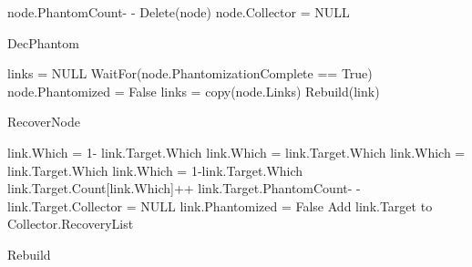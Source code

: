 \setlength{\textfloatsep}{0pt}
\begin{algorithm}[H]
	\scriptsize
	
	\begin{multicols}{2}
		\begin{algorithmic}[1]
{}
\State node.PhantomCount- -
\State Delete(node)
\Else
\State node.Collector = NULL
\EndIf
\EndIf
{}
\EndProcedure
\caption{DecPhantom}
\label{single:algorithm:decPhantom}
\end{algorithmic}
\end{multicols}
\end{algorithm}
\setlength{\textfloatsep}{0pt}



\begin{algorithm}[H]
	\scriptsize
	
	\begin{multicols}{2}
		\begin{algorithmic}[1]
{}
\State links = NULL
\State WaitFor(node.PhantomizationComplete == True)
\State node.Phantomized = False
\State links = copy(node.Links)
\EndIf
{}
\State Rebuild(link)
\EndFor
\EndProcedure
\caption{RecoverNode}
\label{algorithm:recover}
\end{algorithmic}
\end{multicols}
\end{algorithm}
\setlength{\textfloatsep}{0pt}



\begin{algorithm}[H]
	\scriptsize
	
	\begin{multicols}{2}
		\begin{algorithmic}[1]
{}
\State link.Which = 1- link.Target.Which
\State link.Which = link.Target.Which
\State link.Which = link.Target.Which
\Else
\State link.Which = 1-link.Target.Which
\EndIf
\State link.Target.Count[link.Which]++
\State link.Target.PhantomCount- -
\State link.Target.Collector = NULL
\EndIf
\State link.Phantomized = False 
\State Add link.Target to Collector.RecoveryList
\EndIf
{}
 \EndProcedure
\caption{Rebuild}
\label{single:algorithm:rebuild}

\end{algorithmic}
\end{multicols}
\end{algorithm}
\setlength{\textfloatsep}{0pt}



